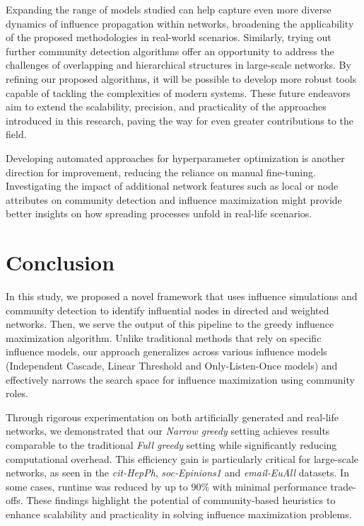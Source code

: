 \documentclass[pdflatex,sn-mathphys-ay]{sn-jnl}
\begin{document}
Expanding the range of models studied can help capture even more diverse dynamics of influence propagation within networks, broadening the applicability of the proposed methodologies in real-world scenarios. Similarly, trying out further community detection algorithms offer an opportunity to address the challenges of overlapping and hierarchical structures in large-scale networks. By refining our proposed algorithms, it will be possible to develop more robust tools capable of tackling the complexities of modern systems. These future endeavors aim to extend the scalability, precision, and practicality of the approaches introduced in this research, paving the way for even greater contributions to the field.

Developing automated approaches for hyperparameter optimization is another direction for improvement, reducing the reliance on manual fine-tuning. Investigating the impact of additional network features such as local or node attributes on community detection and influence maximization might provide better insights on how spreading processes unfold in real-life scenarios.


\section{Conclusion}\label{sec_conclusion}

In this study, we proposed a novel framework that uses influence simulations and community detection to identify influential nodes in directed and weighted networks. Then, we serve the output of this pipeline to the greedy influence maximization algorithm. Unlike traditional methods that rely on specific influence models, our approach generalizes across various influence models (Independent Cascade, Linear Threshold and Only-Listen-Once models) and effectively narrows the search space for influence maximization using community roles.

Through rigorous experimentation on both artificially generated and real-life networks, we demonstrated that our \textit{Narrow greedy} setting achieves results comparable to the traditional \textit{Full greedy} setting while significantly reducing computational overhead. This efficiency gain is particularly critical for large-scale networks, as seen in the \textit{cit-HepPh}, \textit{soc-Epinions1} and \textit{email-EuAll} datasets. In some cases, runtime was reduced by up to $90\%$ with minimal performance trade-offs. These findings highlight the potential of community-based heuristics to enhance scalability and practicality in solving influence maximization problems.
\end{document}
